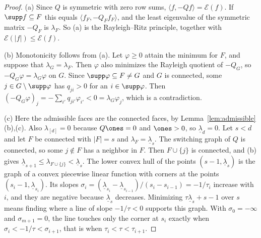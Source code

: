 \begin{proof}
(a) Since $Q$ is symmetric with zero row sums, $\langle
f,-Qf\rangle=\mathcal E(f)$. If $\supp f\subseteq F$ this equals $\langle
f_F,-Q_Ff_F\rangle$, and the least eigenvalue of the symmetric matrix $-Q_F$ is
$\lambda_F$. So (a) is the Rayleigh--Ritz principle, together with $\mathcal
E(\lvert f\rvert)\le\mathcal E(f)$.

(b) Monotonicity follows from (a). Let $\varphi\ge0$ attain the minimum for
$F$, and suppose that $\lambda_G=\lambda_F$. Then $\varphi$ also minimizes the
Rayleigh quotient of $-Q_G$, so $-Q_G\varphi=\lambda_G\varphi$ on $G$. Since
$\supp\varphi\subseteq F\ne G$ and $G$ is connected, some
$j\in G\setminus\supp\varphi$ has $q_{ji}>0$ for an $i\in\supp\varphi$. Then
$(-Q_G\varphi)_j=-\sum_{i'}q_{ji'}\varphi_{i'}<0=\lambda_G\varphi_j$, which is
a contradiction.

(c) Here the admissible faces are the connected faces, by
Lemma~\ref{lem:admissible}(b),(c). Also $\lambda_{[d]}=0$ because $Q\ones=0$
and $\ones>0$, so $\underline\lambda_d=0$. Let $s<d$ and let $F$ be connected
with $\lvert F\rvert=s$ and $\lambda_F=\underline\lambda_s$. The switching
graph of $Q$ is connected, so some $j\notin F$ has a neighbor in $F$. Then
$F\cup\{j\}$ is connected, and (b) gives
$\underline\lambda_{s+1}\le\lambda_{F\cup\{j\}}<\underline\lambda_s$. The
lower convex hull of the points $(s-1,\underline\lambda_s)$ is the graph of a
convex piecewise linear function with corners at the points
$(s_i-1,\underline\lambda_{s_i})$. Its slopes
$\sigma_i=(\underline\lambda_{s_i}-\underline\lambda_{s_{i-1}})/(s_i-s_{i-1})
=-1/\tau_i$ increase with $i$, and they are negative because
$\underline\lambda_s$ decreases. Minimizing $\tau\underline\lambda_s+s-1$
over $s$ means finding where a line of slope $-1/\tau<0$ supports this graph.
With $\sigma_0=-\infty$ and $\sigma_{m+1}=0$, the line touches only the corner
at $s_i$ exactly when $\sigma_i<-1/\tau<\sigma_{i+1}$, that is when
$\tau_i<\tau<\tau_{i+1}$.
\end{proof}
